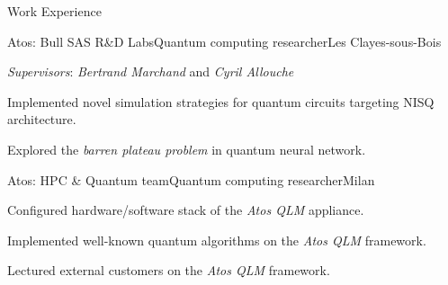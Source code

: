 \documentclass[
	a4paper, %
	11pt, %
]{tresume} %
\begin{document}
\begin{tSection}{Work Experience}
  \begin{tSubsection}{Atos: Bull SAS R\&D Labs}{\origdate{}}{Quantum computing researcher}{Les Clayes-sous-Bois}
  \item \emph{Supervisors}: \emph{Bertrand Marchand} and \emph{Cyril Allouche}
  \item Implemented novel simulation strategies for quantum circuits targeting
    NISQ architecture.
  \item Explored the \emph{barren plateau problem} in quantum neural network.
  \end{tSubsection}

  \begin{tSubsection}{Atos: HPC \& Quantum team}{\origdate{}}{Quantum computing researcher}{Milan}
  \item Configured hardware/software stack of the \textit{Atos QLM} appliance.
  \item Implemented well-known quantum algorithms on the \textit{Atos QLM} framework.
  \item Lectured external customers on the \textit{Atos QLM} framework.
\end{tSubsection}
\end{tSection}
\end{document}
